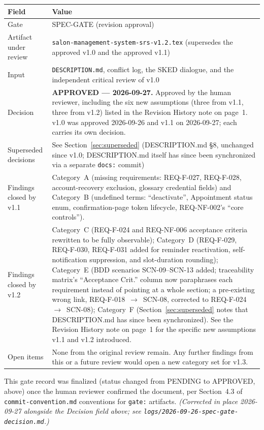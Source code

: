 \documentclass[11pt,a4paper]{article}
\begin{document}
\begin{tabularx}{\textwidth}{@{}lX@{}}
\toprule
Field & Value \\
\midrule
Gate & SPEC-GATE (revision approval) \\
Artifact under review & \texttt{salon-management-system-srs-v1.2.tex}
  (supersedes the approved v1.0 and the approved v1.1) \\
Input & \texttt{DESCRIPTION.md}, conflict log, the SKED dialogue,
  and the independent critical review of v1.0 \\
Decision & \textbf{APPROVED --- 2026-09-27.} Approved by the human
  reviewer, including the six new assumptions (three from v1.1, three from
  v1.2) listed in the Revision History note on page~1. v1.0 was approved
  2026-09-26 and v1.1 on 2026-09-27; each carries its own decision. \\
Superseded decisions & See Section~\ref{sec:superseded} (DESCRIPTION.md
  \S8, unchanged since v1.0; DESCRIPTION.md itself has since been
  synchronized via a separate \texttt{docs:} commit) \\
Findings closed by v1.1 & Category~A (missing requirements: REQ-F-027,
  REQ-F-028, account-recovery exclusion, glossary credential fields) and
  Category~B (undefined terms: ``deactivate'', Appointment status enum,
  confirmation-page token lifecycle, REQ-NF-002's ``core controls''). \\
Findings closed by v1.2 & Category~C (REQ-F-024 and REQ-NF-006 acceptance
  criteria rewritten to be fully observable); Category~D (REQ-F-029,
  REQ-F-030, REQ-F-031 added for reminder reactivation, self-notification
  suppression, and slot-duration rounding); Category~E (BDD scenarios
  SCN-09--SCN-13 added; traceability matrix's ``Acceptance Crit.'' column
  now paraphrases each requirement instead of pointing at a whole section;
  a pre-existing wrong link, REQ-F-018~$\to$~SCN-08, corrected to
  REQ-F-024~$\to$~SCN-08); Category~F (Section~\ref{sec:superseded} notes
  that DESCRIPTION.md has since been synchronized). See the Revision
  History note on page~1 for the specific new assumptions v1.1 and v1.2
  introduced. \\
Open items & None from the original review remain. Any further findings
  from this or a future review would open a new category set for v1.3. \\
\bottomrule
\end{tabularx}

\noindent This gate record was finalized (status changed from PENDING to
APPROVED, above) once the human reviewer confirmed the document, per
Section~4.3 of \texttt{commit-convention.md} conventions for \texttt{gate:}
artifacts. \emph{(Corrected in place 2026-09-27 alongside the Decision
field above; see \texttt{logs/2026-09-26-spec-gate-decision.md}.)}
\end{document}
